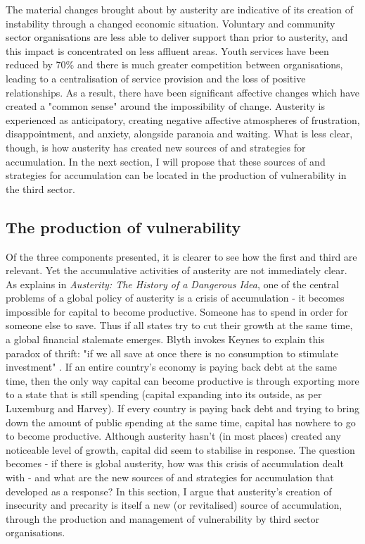 The material changes brought about by austerity are indicative of its creation of instability through a changed economic situation. Voluntary and community sector organisations are less able to deliver support than prior to austerity, and this impact is concentrated on less affluent areas. Youth services have been reduced by 70\% and there is much greater competition between organisations, leading to a centralisation of service provision and the loss of positive relationships. As a result, there have been significant affective changes which have created a "common sense" around the impossibility of change. Austerity is experienced as anticipatory, creating negative affective atmospheres of frustration, disappointment, and anxiety, alongside paranoia and waiting. What is less clear, though, is how austerity has created new sources of and strategies for accumulation. In the next section, I will propose that these sources of and strategies for accumulation can be located in the production of vulnerability in the third sector.

\subsection{The production of vulnerability}
\label{subsec:the-production-of-vulnerability}

Of the three components presented, it is clearer to see how the first and third are relevant. Yet the accumulative activities of austerity are not immediately clear. As \citet{blyth_austerity_2013} explains in \emph{Austerity: The History of a Dangerous Idea}, one of the central problems of a global policy of austerity is a crisis of accumulation - it becomes impossible for capital to become productive. Someone has to spend in order for someone else to save. Thus if all states try to cut their growth at the same time,  a global financial stalemate emerges. Blyth invokes Keynes to explain this paradox of thrift: "if we all save at once there is no consumption to stimulate investment" \citep[p. 8]{blyth_austerity_2013}. If an entire country's economy is paying back debt at the same time, then the only way capital can become productive is through exporting more to a state that is still spending (capital expanding into its outside, as per Luxemburg and Harvey). If every country is paying back debt and trying to bring down the amount of public spending at the same time, capital has nowhere to go to become productive. Although austerity hasn't (in most places) created any noticeable level of growth, capital did seem to stabilise in response. The question becomes - if there is global austerity, how was this crisis of accumulation dealt with - and what are the new sources of and strategies for accumulation that developed as a response? In this section, I argue that austerity's creation of insecurity and precarity is itself a new (or revitalised) source of accumulation, through the production and management of vulnerability by third sector organisations. 

